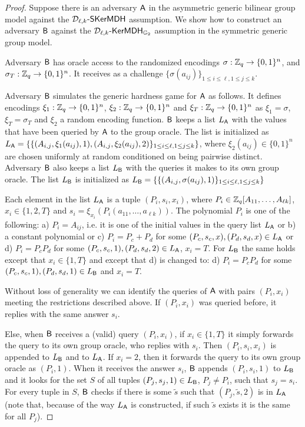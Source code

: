 \begin{proof} Suppose there is an adversary $\mathsf{A}$  in the asymmetric generic bilinear group model against the $\mathcal{D}_{\ell,k}\mbox{-}\mathsf{SKerMDH}$ assumption.  We show how to construct an adversary $\mathsf{B}$ against the  $\mathcal{D}_{\ell,k}\mbox{-}\mathsf{KerMDH}_{\mathbb{G}_2}$ assumption in the symmetric generic group model. 


Adversary $\mathsf{B}$ has oracle access to the randomized encodings $\sigma: \mathbb{Z}_q \to \{0,1\}^n$, 
and $\sigma_T: \mathbb{Z}_q \to \{0,1\}^n$. It receives as a challenge $\{ \sigma(a_{ij})\}_{1\leq i \leq \ell, 1\leq j \leq k}$.

Adversary $\mathsf{B}$ simulates the generic hardness game for $\mathsf{A}$ as follows. It defines encodings  $\xi_1: \mathbb{Z}_q \to \{0,1\}^n$, $\xi_2: \mathbb{Z}_q \to \{0,1\}^n$ and $\xi_T: \mathbb{Z}_q \to \{0,1\}^n$ as $\xi_1=\sigma$, $\xi_T=\sigma_T$ and $\xi_2$ a random encoding function. $\mathsf{B}$ keeps a list $L_{\mathsf{A}}$  with the values that have been queried by $\mathsf{A}$ to the group oracle. The list is initialized as 
$L_{\mathsf{A}}=\{  \{(A_{i,j},\xi_1(a_{ij}),1),(A_{i,j},\xi_2(a_{ij}),2)\}_{1\leq i \leq \ell, 1\leq j \leq k}\}$, where $\xi_2(a_{ij}) \in \{0,1\}^n$ are chosen uniformly at random conditioned on being pairwise distinct.  Adversary $\mathsf{B}$ also keeps a list $L_{\mathsf{B}}$ with the queries 
it makes to its own group oracle. The list $L_{\mathsf{B}}$ is initialized as 
$L_{\mathsf{B}}=\{  \{(A_{i,j},\sigma(a_{ij}),1)\}_{1\leq i \leq \ell, 1\leq j \leq k}\}$

Each element in the list $L_{\mathsf{A}}$ is a tuple $(P_i,s_i,x_i)$, where $P_i \in \mathbb{Z}_q[A_{11}, \ldots,A_{\ell k}]$, $x_i \in \{1,2,T\}$ and $s_i=\xi_{x_i}(P_i(a_{11},\ldots,a_{\ell k}))$. The polynomial $P_i$ is one of the following:  a) $P_i=A_{ij}$, i.e. it is one of the initial values in the query list  
$L_{\mathsf{A}}$  or b) a constant polynomial or c) $P_i=P_c+P_d$ for some $(P_c,s_c,x),(P_d,s_d,x) \in L_{\mathsf{A}}$ or d) $P_i=P_cP_d$ for some $(P_c,s_c,1),(P_d,s_d,2) \in L_{\mathsf{A}}$, $x_i=T$. For $L_{\mathsf{B}}$ the same holds except that $x_i \in \{1,T\}$ and except that d) is changed to: d) $P_i=P_cP_d$ for some $(P_c,s_c,1),(P_d,s_d,1) \in L_{\mathsf{B}}$ and $x_i=T$. 

Without loss of generality we can identify the queries of $\mathsf{A}$ with 
pairs $(P_i,x_i)$ meeting the restrictions described above. If $(P_i,x_i)$ was queried before, it replies with the same answer $s_i$.

Else, when $\mathsf{B}$ receives a (valid) query $(P_i,x_i)$, if $x_i \in \{1,T\}$ it simply forwards  the query to its own group oracle, who replies with $s_i$. Then $(P_i,s_i,x_i)$ is appended to $L_{\mathsf{B}}$ and to $L_{\mathsf{A}}$. If $x_i =2$, then it forwards the query to its own group oracle as $(P_i,1)$. When it receives the answer $s_i$, 
$\mathsf{B}$ appends $(P_i,s_i,1)$ to $L_{\mathsf{B}}$ and it looks for the set $S$ of all  tuples $(P_j,s_j,1) \in L_{\mathsf{B}}$, $P_j \neq P_i$,  such that $s_j=s_i$. 
For every tuple in $S$, $\mathsf{B}$ checks if there is some $\tilde{s}$ such that $(P_j,\tilde{s},2)$ is in $L_{\mathsf{A}}$ (note that, because of the way $L_{\mathsf{A}}$ is constructed, if such $\tilde{s}$ exists it is the same for all $P_j$). 


\end{proof}
